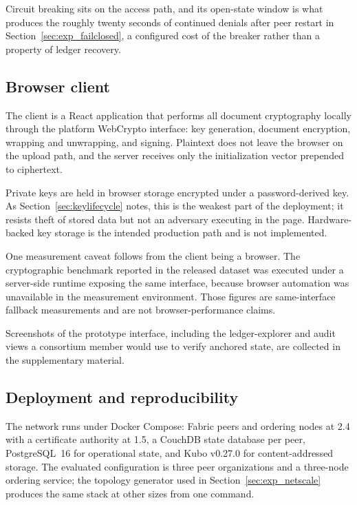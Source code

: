 \documentclass[preprint,12pt]{elsarticle}
\begin{document}
Circuit breaking sits on the access path, and its open-state window is what
produces the roughly twenty seconds of continued denials after peer restart in
Section~\ref{sec:exp_failclosed}, a configured cost of the breaker rather
than a property of ledger recovery.

\subsection{Browser client}
\label{sec:client}

The client is a React application that performs all document cryptography
locally through the platform WebCrypto interface: key generation, document
encryption, wrapping and unwrapping, and signing. Plaintext does not leave the
browser on the upload path, and the server receives only the initialization
vector prepended to ciphertext.

Private keys are held in browser storage encrypted under a password-derived
key. As Section~\ref{sec:keylifecycle} notes, this is the weakest part of the
deployment; it resists theft of stored data but not an adversary executing in
the page. Hardware-backed key storage is the intended production path and is
not implemented.

One measurement caveat follows from the client being a browser. The
cryptographic benchmark reported in the released dataset was executed under a
server-side runtime exposing the same interface, because browser automation was
unavailable in the measurement environment. Those figures are same-interface
fallback measurements and are not browser-performance claims.

Screenshots of the prototype interface, including the ledger-explorer and
audit views a consortium member would use to verify anchored state, are
collected in the supplementary material.

\subsection{Deployment and reproducibility}
\label{sec:deployment}

The network runs under Docker Compose: Fabric peers and ordering nodes at 2.4
with a certificate authority at 1.5, a CouchDB state database per peer,
PostgreSQL~16 for operational state, and Kubo v0.27.0 for content-addressed
storage. The evaluated configuration is three peer organizations and a
three-node ordering service; the topology generator used in
Section~\ref{sec:exp_netscale} produces the same stack at other sizes from one
command.
\end{document}
